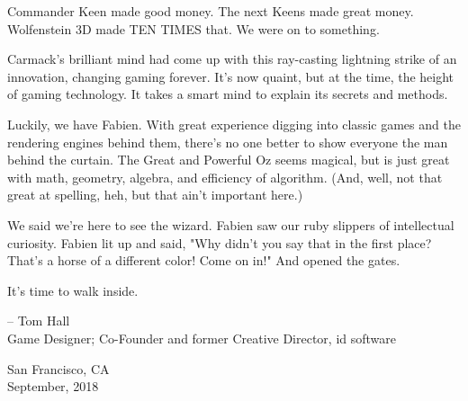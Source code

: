 Commander Keen made good money. The next Keens made great money. Wolfenstein 3D made TEN TIMES that.  We were on to something.\\
\par
Carmack's brilliant mind had come up with this ray-casting lightning strike of an innovation, changing gaming forever. It's now quaint, but at the time, the height of gaming technology.  It takes a smart mind to explain its secrets and methods.\\
\par
Luckily, we have Fabien.  With great experience digging into classic games and the rendering engines behind them, there's no one better to show everyone the man behind the curtain. The Great and Powerful Oz seems magical, but is just great with math, geometry, algebra, and efficiency of algorithm. (And, well, not that great at spelling, heh, but that ain't important here.)\\
\par
We said we're here to see the wizard. Fabien saw our ruby slippers of intellectual curiosity.
Fabien lit up and said, "Why didn't you say that in the first place? That's a horse of a different color! Come on in!" And opened the gates.\\
\par
It's time to walk inside.\\
\par
-- Tom Hall\\
Game Designer;  Co-Founder and former Creative Director, id software\\
\par
San Francisco, CA\\
September, 2018\\